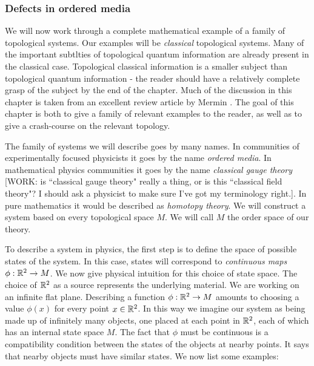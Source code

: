 \documentclass{article}
\theoremstyle{definition}
\numberwithin{figure}{section}
\begin{document}
\subsubsection{Defects in ordered media}

We will now work through a complete mathematical example of a family of topological systems. Our examples will be \textit{classical} topological systems. Many of the important subtlties of topological quantum information are already present in the classical case. Topological classical information is a smaller subject than topological quantum information - the reader should have a relatively complete grasp of the subject by the end of the chapter. Much of the discussion in this chapter is taken from an excellent review article by Mermin \cite{mermin1979topological}. The goal of this chapter is both to give a family of relevant examples to the reader, as well as to give a crash-course on the relevant topology.

The family of systems we will describe goes by many names. In communities of experimentally focused physicists it goes by the name \textit{ordered media}. In mathematical physics communities it goes by the name \textit{classical gauge theory} [WORK: is ``classical gauge theory" really a thing, or is this ``classical field theory"? I should ask a physicist to make sure I've got my terminology right.]. In pure mathematics it would be described as \textit{homotopy theory}. We will construct a system based on every topological space $M$. We will call $M$ the order space of our theory.

To describe a system in physics, the first step is to define the space of possible states of the system. In this case, states will correspond to \textit{continuous maps $\phi: \mathbb{R}^2\to M$}. We now give physical intuition for this choice of state space. The choice of $\mathbb{R}^2$ as a source represents the underlying material. We are working on an infinite flat plane. Describing a function $\phi: \mathbb{R}^2\to M$ amounts to choosing a value $\phi(x)$ for every point $x\in \mathbb{R}^2$. In this way we imagine our system as being made up of infinitely many objects, one placed at each point in $\mathbb{R}^2$, each of which has an internal state space $M$. The fact that $\phi$ must be continuous is a compatibility condition between the states of the objects at nearby points. It says that nearby objects must have similar states. We now list some examples:
\end{document}
